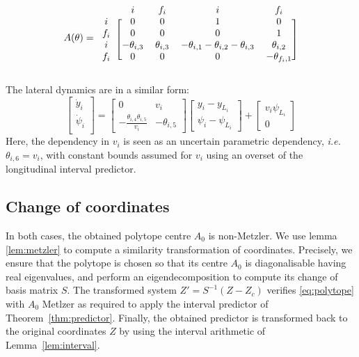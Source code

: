 \documentclass{article}
\begin{document}
\begin{equation*}
A(\theta)
=
\begin{blockarray}{ccccc}
 & i & f_i & i & f_i \\
\begin{block}{c[cccc]}
i & 0 & 0 & 1 & 0 \\
f_i & 0 & 0 & 0 & 1 \\
i & -\theta_{i,3} & \theta_{i,3} & -\theta_{i,1}-\theta_{i,2}-\theta_{i,3} & \theta_{i,2} \\
f_i & 0 & 0 & 0 & -\theta_{f_i,1} \\
\end{block}
\end{blockarray}
\end{equation*}

The lateral dynamics are in a similar form:
\begin{equation*}
\begin{bmatrix}
\dot{y}_i \\
\dot{\psi}_i \\
\end{bmatrix}
=
\begin{bmatrix}
0 & v_i \\
-\frac{\theta_{i,4} \theta_{i,5}}{v_i} & -\theta_{i,5}
\end{bmatrix}
\begin{bmatrix}
y_i - y_{L_i} \\
\psi_i - \psi_{L_i}
\end{bmatrix}
+
\begin{bmatrix}
v_i\psi_{L_i} \\
0
\end{bmatrix}
\end{equation*}
Here, the dependency in $v_i$ is seen as an uncertain parametric dependency, \emph{i.e.} $\theta_{i,6}=v_i$, with constant bounds assumed for $v_i$ using an overset of the longitudinal interval predictor.

\subsection{Change of coordinates}
In both cases, the obtained polytope centre $A_0$ is non-Metzler.
We use lemma \ref{lem:metzler} to compute a similarity transformation of coordinates. Precisely, we ensure that the polytope is chosen so that its centre $A_0$ is diagonalisable having real eigenvalues, and perform an eigendecomposition to compute its change of basis matrix $S$. The transformed system $Z'=S^{-1}(Z-Z_c)$ verifies \eqref{eq:polytope} with $A_0$ Metlzer as required to apply the interval predictor of Theorem~\ref{thm:predictor}. Finally, the obtained predictor is transformed back to the original coordinates $Z$ by using the interval arithmetic of Lemma~\ref{lem:interval}.
\end{document}
